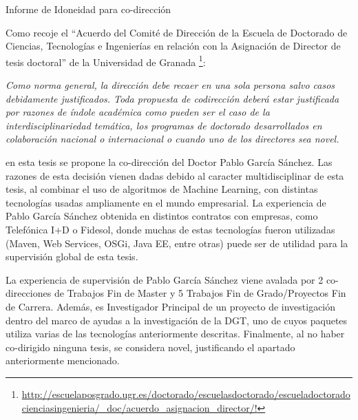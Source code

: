 Informe de Idoneidad para co-dirección

Como recoje el ``Acuerdo del Comité de Dirección de la Escuela de Doctorado de Ciencias, Tecnologías e Ingenierías en relación con la Asignación de Director de tesis doctoral'' de la Universidad de Granada \footnote{\url{http://escuelaposgrado.ugr.es/doctorado/escuelasdoctorado/escueladoctoradocienciasingenieria/_doc/acuerdo_asignacion_director/!}}: 

{\em Como norma general, la dirección debe recaer en una sola persona salvo casos
debidamente justificados. Toda propuesta de codirección deberá estar justificada por
razones de índole académica como pueden ser el caso de la interdisciplinariedad
temática, los programas de doctorado desarrollados en colaboración nacional o
internacional o cuando uno de los directores sea novel.}

en esta tesis se propone la co-dirección del Doctor Pablo García Sánchez. Las razones de esta decisión vienen dadas debido al caracter multidisciplinar de esta tesis, al combinar el uso de algoritmos de Machine Learning, con distintas tecnologías usadas ampliamente en el mundo empresarial. La experiencia de Pablo García Sánchez obtenida en distintos contratos con empresas, como Telefónica I+D o Fidesol, donde muchas de estas tecnologías fueron utilizadas (Maven, Web Services, OSGi, Java EE, entre otras) puede ser de utilidad para la supervisión global de esta tesis.

La experiencia de supervisión de Pablo García Sánchez viene avalada por 2 co-direcciones de Trabajos Fin de Master y 5 Trabajos Fin de Grado/Proyectos Fin de Carrera. Además, es Investigador Principal de un proyecto de investigación dentro del marco de ayudas a la investigación de la DGT, uno de cuyos paquetes utiliza varias de las tecnologías anteriormente descritas. Finalmente, al no haber co-dirigido ninguna tesis, se considera novel, justificando el apartado anteriormente mencionado.